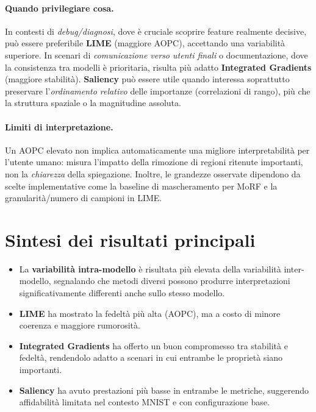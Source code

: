 \documentclass[12pt,a4paper,oneside]{report}
\numberwithin{figure}{chapter}
\numberwithin{table}{chapter}
\begin{document}
\paragraph{Quando privilegiare cosa.}
In contesti di \emph{debug/diagnosi}, dove è cruciale scoprire feature
realmente decisive, può essere preferibile \textbf{LIME} (maggiore AOPC),
accettando una variabilità superiore. In scenari di \emph{comunicazione verso
      utenti finali} o documentazione, dove la consistenza tra modelli è prioritaria,
risulta più adatto \textbf{Integrated Gradients} (maggiore stabilità).
\textbf{Saliency} può essere utile quando interessa soprattutto preservare
l’\emph{ordinamento relativo} delle importanze (correlazioni di rango), più che
la struttura spaziale o la magnitudine assoluta.

\paragraph{Limiti di interpretazione.}
Un AOPC elevato non implica automaticamente una migliore interpretabilità per
l’utente umano: misura l’impatto della rimozione di regioni ritenute
importanti, non la \emph{chiarezza} della spiegazione. Inoltre, le grandezze
osservate dipendono da scelte implementative come la baseline di mascheramento
per MoRF e la granularità/numero di campioni in LIME.

\section{Sintesi dei risultati principali}
\begin{itemize}
      \item La \textbf{variabilità intra-modello} è risultata più elevata della variabilità
            inter-modello, segnalando che metodi diversi possono produrre interpretazioni
            significativamente differenti anche sullo stesso modello.
      \item \textbf{LIME} ha mostrato la fedeltà più alta (AOPC), ma a costo di minore coerenza e maggiore rumorosità.
      \item \textbf{Integrated Gradients} ha offerto un buon compromesso tra stabilità e fedeltà, rendendolo adatto a scenari in cui entrambe le proprietà siano importanti.
      \item \textbf{Saliency} ha avuto prestazioni più basse in entrambe le metriche, suggerendo affidabilità limitata nel contesto MNIST e con configurazione base.
\end{itemize}
\end{document}
